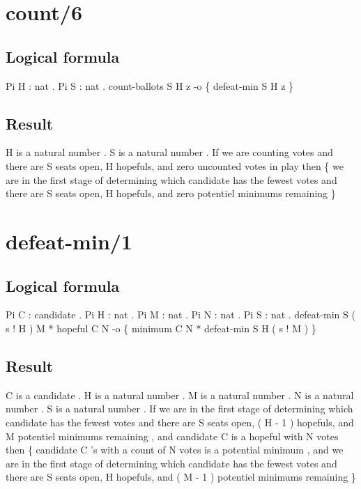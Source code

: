 \section{count/6}
\subsection{Logical formula}
\begin{texto2}
	Pi H : nat . Pi S : nat . count-ballots S H z -o \{ defeat-min S H z \}
\end{texto2}

\subsection{Result}
\begin{texto2}
	H is a natural number . S is a natural number . If we are counting votes and there are S seats open, H hopefuls, and zero uncounted votes in play then \{ we are in the first stage of determining which candidate has the fewest votes and there are S seats open, H hopefuls, and zero potentiel minimums remaining \}
\end{texto2}

\section{defeat-min/1}
\subsection{Logical formula}
\begin{texto2}
	Pi C : candidate . Pi H : nat . Pi M : nat . Pi N : nat . Pi S : nat . defeat-min S ( s ! H ) M * hopeful C N -o \{ minimum C N * defeat-min S H ( s ! M ) \}
\end{texto2}

\subsection{Result}
\begin{texto2}
	C is a candidate . H is a natural number . M is a natural number . N is a natural number . S is a natural number . If we are in the first stage of determining which candidate has the fewest votes and there are S seats open, ( H - 1 ) hopefuls, and M potentiel minimums remaining , and candidate C is a hopeful with N votes then \{ candidate C 's with a count of N votes is a potential minimum , and we are in the first stage of determining which candidate has the fewest votes and there are S seats open, H hopefuls, and ( M - 1 ) potentiel minimums remaining \}
\end{texto2}


